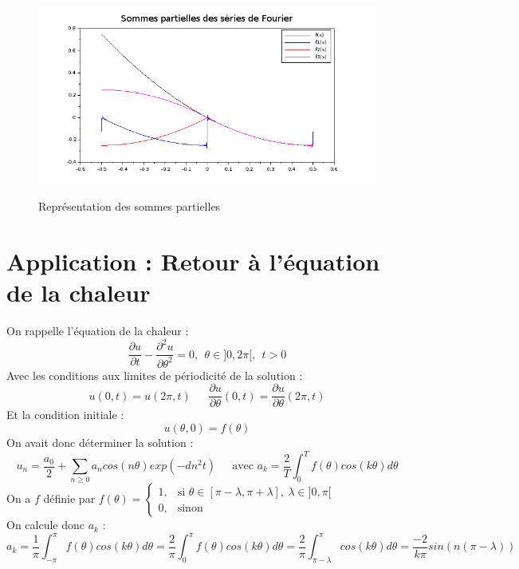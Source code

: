 \documentclass[a4paper,10pt]{report}
\begin{document}
\begin{figure}[H]
\centering
\caption{Représentation des sommes partielles}
\includegraphics[width=\textwidth]{fourier.png}
\label{graph_fourier}
\end{figure}

\section{Application : Retour à l'équation de la chaleur}
On rappelle l'équation de la chaleur :
\abovedisplayskip=0mm
\begin{displaymath}
\frac{\partial u}{\partial t} - \frac{\partial^2 u}{\partial \theta^2} = 0, \ \ \theta \in ]0,2\pi[, \ \ t>0
\end{displaymath}
Avec les conditions aux limites de périodicité de la solution :
\abovedisplayskip=0mm
\begin{displaymath}
u(0,t)=u(2\pi,t) \ \ \ \ \ \ \ \frac{\partial u}{\partial \theta}(0,t) = \frac{\partial u}{\partial \theta}(2\pi,t)
\end{displaymath}
Et la condition initiale :
\abovedisplayskip=0mm
\begin{displaymath}
u(\theta,0)=f(\theta)
\end{displaymath}
On avait donc déterminer la solution :
\abovedisplayskip=0mm
\begin{displaymath}
u_n = \frac{a_0}{2} + \sum \limits_{n\geq0}a_n cos(n \theta) exp(-dn^2t) \ \ \ \ \ \text{ avec } a_k = \frac{2}{T} \int_0^{T}f(\theta)cos(k\theta)d\theta
\end{displaymath}
On a $f$ définie par $f(\theta) = \left\lbrace
\begin{array}{l}
1,\ \ \text{ si } \theta \in [\pi-\lambda,\pi+\lambda], \ \lambda \in ]0,\pi[  \\
0,\ \ \text{ sinon}
\end{array}\right.$ \\
On calcule donc $a_k$ :
\abovedisplayskip=0mm
\begin{displaymath}
a_k=\frac{1}{\pi} \int_{-\pi}^{\pi}f(\theta)cos(k\theta)d\theta = \frac{2}{\pi} \int_{0}^{\pi}f(\theta)cos(k\theta)d\theta = \frac{2}{\pi} \int_{\pi-\lambda}^{\pi}cos(k\theta)d\theta = \frac{-2}{k\pi}sin(n(\pi-\lambda))
\end{displaymath} \\ \\
\end{document}

